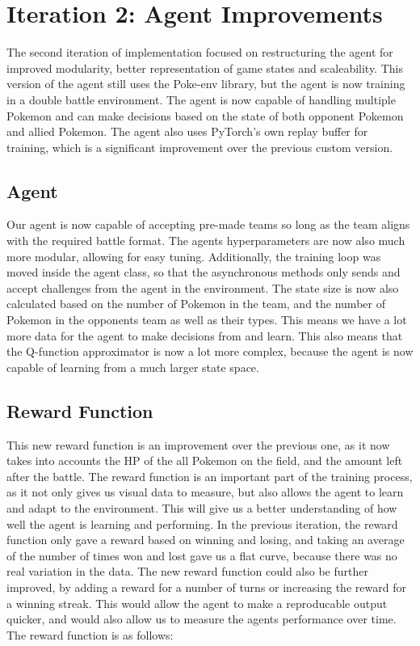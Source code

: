 \section{Iteration 2: Agent Improvements}
\label{sec:Iteration-2-Agent-Environment}
The second iteration of implementation focused on restructuring the agent for improved 
modularity, better representation of game states and scaleability. This version of the agent still
uses the Poke-env library, but the agent is now training in a double battle environment. The
agent is now capable of handling multiple Pokemon and can make decisions based on the state of 
both opponent Pokemon and allied Pokemon. The agent also uses PyTorch's own replay buffer for
training, which is a significant improvement over the previous custom version.

\subsection{Agent}
Our agent is now capable of accepting pre-made teams so long as the team aligns with the required battle
format. The agents hyperparameters are now also much more modular, allowing for easy tuning.
Additionally, the training loop was moved inside the agent class, so that the asynchronous methods only
sends and accept challenges from the agent in the environment. The state size is now also 
calculated based on the number of Pokemon in the team, and the number of Pokemon in the opponents team as well as their types. 
This means we have a lot more data for the agent to make decisions from and learn. 
This also means that the Q-function approximator is now a lot more complex,
because the agent is now capable of learning from a much larger state space. 


\subsection{Reward Function}
This new reward function is an improvement over the previous one, as it now takes into accounts
the HP of the all Pokemon on the field, and the amount left after the battle. The reward function
is an important part of the training process, as it not only gives us visual data to measure, but
also allows the agent to learn and adapt to the environment. This will give us a better understanding
of how well the agent is learning and performing. In the previous iteration, the reward
function only gave a reward based on winning and losing, and taking an average of the number of
times won and lost gave us a flat curve, because there was no real variation in the data.
The new reward function could also be further improved, by adding a reward for a number of turns
or increasing the reward for a winning streak. This would allow the agent to make a reproducable output
quicker, and would also allow us to measure the agents performance over time.
The reward function is as follows:


